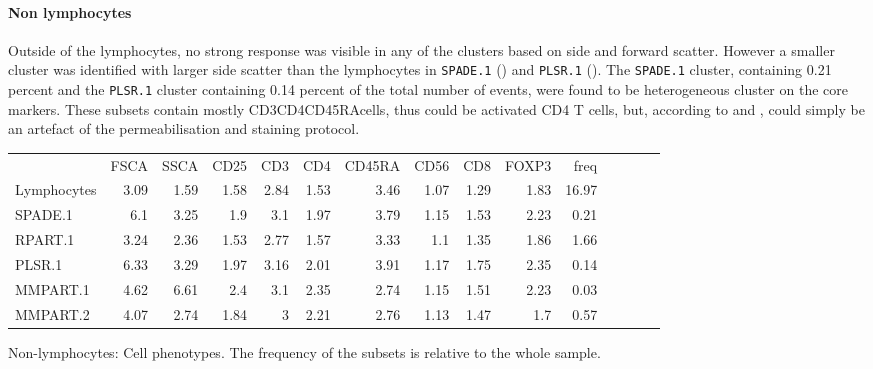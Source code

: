 \paragraph{Non lymphocytes}
Outside of the lymphocytes, no strong response was visible in any of the clusters based on side and forward scatter.
However a smaller cluster was identified with larger side scatter than the lymphocytes in \texttt{SPADE.1} () and \texttt{PLSR.1} ().
The \texttt{SPADE.1} cluster, containing 0.21 percent and the \texttt{PLSR.1} cluster containing 0.14 percent of the total number of events,
were found to be heterogeneous cluster on the core markers.
These subsets contain mostly CD3\positive CD4\positive CD45RA\positive cells, thus could be activated CD4 T cells,
but, according to  and , could simply be an artefact of the permeabilisation and staining protocol.


\begin{table}[h]\footnotesize
\centering
\begin{tabular}{lrrrrrrrrrrrrrr}
\rowcolor{Gray} 
            & FSCA & SSCA & CD25 & CD3  & CD4  & CD45RA & CD56 & CD8  & FOXP3 & freq \\
Lymphocytes & 3.09 & 1.59 & 1.58 & 2.84 & 1.53 & 3.46   & 1.07 & 1.29 & 1.83  & 16.97 \\
SPADE.1     & 6.1  & 3.25 & 1.9  & 3.1  & 1.97 & 3.79   & 1.15 & 1.53 & 2.23  & 0.21 \\
RPART.1     & 3.24 & 2.36 & 1.53 & 2.77 & 1.57 & 3.33   & 1.1  & 1.35 & 1.86  & 1.66 \\
PLSR.1      & 6.33 & 3.29 & 1.97 & 3.16 & 2.01 & 3.91   & 1.17 & 1.75 & 2.35  & 0.14 \\
MMPART.1    & 4.62 & 6.61 & 2.4  & 3.1  & 2.35 & 2.74   & 1.15 & 1.51 & 2.23  & 0.03 \\
MMPART.2    & 4.07 & 2.74 & 1.84 & 3    & 2.21 & 2.76   & 1.13 & 1.47 & 1.7   & 0.57 \\
\end{tabular}
{ Non-lymphocytes: Cell phenotypes. }
{ The frequency of the subsets is relative to the whole sample. }
\end{table}



